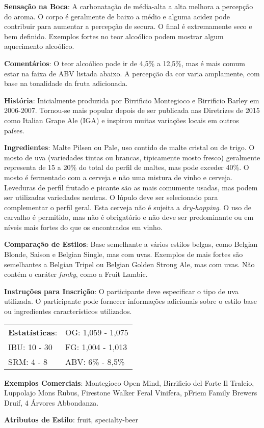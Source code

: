 \textbf{Sensação na Boca}: A carbonatação de média-alta a alta melhora a percepção do aroma. O corpo é geralmente de baixo a médio e alguma acidez pode contribuir para aumentar a percepção de secura. O final é extremamente seco e bem definido. Exemplos fortes no teor alcoólico podem mostrar algum aquecimento alcoólico.

\textbf{Comentários}: O teor alcoólico pode ir de 4,5\% a 12,5\%, mas é mais comum estar na faixa de ABV listada abaixo. A percepção da cor varia amplamente, com base na tonalidade da fruta adicionada.

\textbf{História}: Inicialmente produzida por Birrificio Montegioco e Birrificio Barley em 2006-2007. Tornou-se mais popular depois de ser publicada nas Diretrizes de 2015 como Italian Grape Ale (IGA) e inspirou muitas variações locais em outros países.

\textbf{Ingredientes}: Malte Pilsen ou Pale, uso contido de malte cristal ou de trigo. O mosto de uva (variedades tintas ou brancas, tipicamente mosto fresco) geralmente representa de 15 a 20\% do total do perfil de maltes, mas pode exceder 40\%. O mosto é fermentado com a cerveja e não uma mistura de vinho e cerveja. Leveduras de perfil frutado e picante são as mais comumente usadas, mas podem ser utilizadas variedades neutras. O lúpulo deve ser selecionado para complementar o perfil geral. Esta cerveja não é sujeita a \textit{dry-hopping}. O uso de carvalho é permitido, mas não é obrigatório e não deve ser predominante ou em níveis mais fortes do que os encontrados em vinho.

\textbf{Comparação de Estilos}: Base semelhante a vários estilos belgas, como Belgian Blonde, Saison e Belgian Single, mas com uvas. Exemplos de mais fortes são semelhantes a Belgian Tripel ou Belgian Golden Strong Ale, mas com uvas. Não contém o caráter \textit{funky}, como a Fruit Lambic.

\textbf{Instruções para Inscrição}: O participante deve especificar o tipo de uva utilizada. O participante pode fornecer informações adicionais sobre o estilo base ou ingredientes característicos utilizados.

\begin{tabular}{@{}p{35mm}p{35mm}@{}}
  \textbf{Estatísticas}: & OG: 1,059 - 1,075 \\
  IBU: 10 - 30  & FG: 1,004 - 1,013  \\
  SRM: 4 - 8  & ABV: 6\% - 8,5\%
\end{tabular}

\textbf{Exemplos Comerciais}: Montegioco Open Mind, Birrificio del Forte Il Tralcio, Luppolajo Mons Rubus, Firestone Walker Feral Vinifera, pFriem Family Brewers Druif, 4 Árvores Abbondanza.

\textbf{Atributos de Estilo}: fruit, specialty-beer
